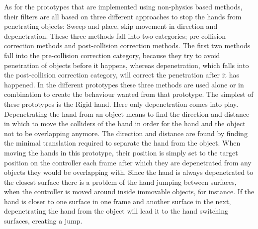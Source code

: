 As for the prototypes that are implemented using non-physics based methods, their filters are all based on three different approaches to stop the hands from penetrating objects: Sweep and place, skip movement in direction and depenetration. These three methods fall into two categories; pre-collision correction methods and post-collision correction methods. The first two methods fall into the pre-collision correction category, because they try to avoid penetration of objects before it happens, whereas depenetration, which falls into the post-collision correction category, will correct the penetration after it has happened. In the different prototypes these three methods are used alone or in combination to create the behaviour wanted from that prototype. The simplest of these prototypes is the Rigid hand. Here only depenetration comes into play. Depenetrating the hand from an object means to find the direction and distance in which to move the colliders of the hand in order for the hand and the object not to be overlapping anymore. The direction and distance are found by finding the minimal translation required to separate the hand from the object. When moving the hands in this prototype, their position is simply set to the target position on the controller each frame after which they are depenetrated from any objects they would be overlapping with. Since the hand is always depenetrated to the closest surface there is a problem of the hand jumping between surfaces, when the controller is moved around inside immovable objects, for instance. If the hand is closer to one surface in one frame and another surface in the next, depenetrating the hand from the object will lead it to the hand switching surfaces, creating a jump.

